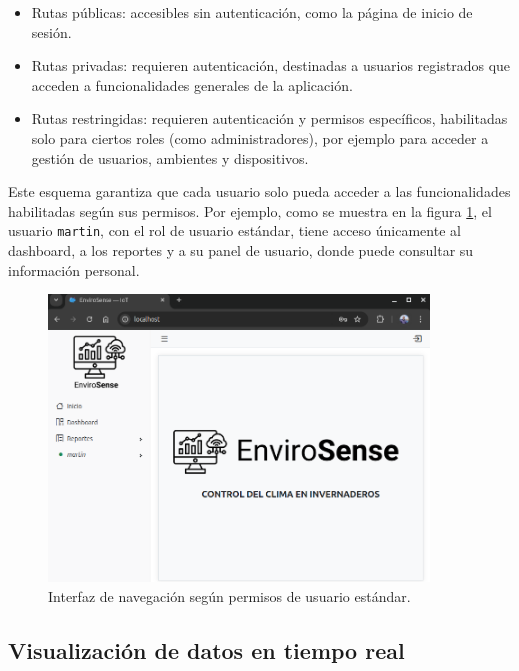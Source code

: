 \begin{itemize}
    \item Rutas públicas: accesibles sin autenticación, como la página de inicio de
          sesión.
    \item Rutas privadas: requieren autenticación, destinadas a usuarios registrados que
          acceden a funcionalidades generales de la aplicación.
    \item Rutas restringidas: requieren autenticación y permisos específicos, habilitadas
          solo para ciertos roles (como administradores), por ejemplo para acceder a
          gestión de usuarios, ambientes y dispositivos.
\end{itemize}

Este esquema garantiza que cada usuario solo pueda acceder a las
funcionalidades habilitadas según sus permisos. Por ejemplo, como se muestra en
la figura \ref{fig:navegacion}, el usuario \texttt{martin}, con el rol de
usuario estándar, tiene acceso únicamente al dashboard, a los reportes y a su
panel de usuario, donde puede consultar su información personal.

\begin{figure}[H]
    \centering
    \includegraphics[width=0.90\textwidth]{./Images/26_navegacion.png}
    \caption{Interfaz de navegación según permisos de usuario estándar.}
    \label{fig:navegacion}
\end{figure}

\subsection{Visualización de datos en tiempo real}

